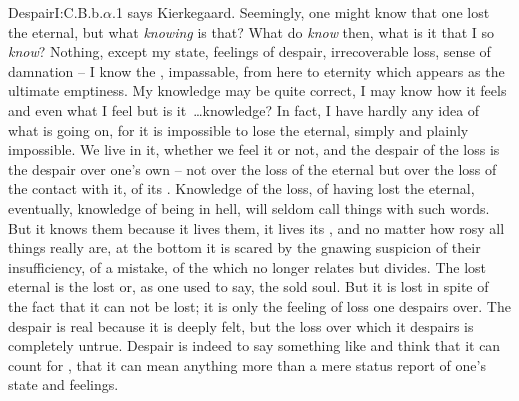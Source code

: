 \citet{To despair is to lose the
  eternal}{Despair}{I:C.B.b.$\alpha$.1} says Kierkegaard.
Seemingly, one might know that one lost the eternal, but what {\em knowing} is
that? What do  {\em know} then, what is it that I so {\em know}?  Nothing,
except my  state, feelings of despair, irrecoverable loss, sense of
damnation -- I know the , impassable, from here to eternity which
appears as the ultimate emptiness.  My knowledge may be quite correct, I may
know how it feels and even what I feel but is it~\ldots knowledge? In fact, I
have hardly any idea of what is going on, for it is impossible to lose the
eternal, simply and plainly impossible. We live in it, whether we feel it or
not, and the despair of the loss is the despair over one's own  --
not over the loss of the eternal but over the loss of the contact with it, of
its .  Knowledge of the loss, of having lost the eternal,
eventually, knowledge of being in hell, will seldom call things with such words.
But it knows them because it lives them, it lives its \No, and no matter how
rosy all  things really are, at the bottom it is scared by the
gnawing suspicion of their insufficiency, of a mistake, of the 
which no longer relates but divides. The lost eternal is the lost 
or, as one used to say, the sold soul. But it is lost in spite of the fact that
it can not be lost; it is only the feeling of loss one despairs over. The
despair is real because it is deeply felt, but the loss over which it despairs
is completely untrue. Despair is indeed to say something like  and think that it can count for , that it
can mean anything more than a mere status report of one's  state and
feelings.
  
